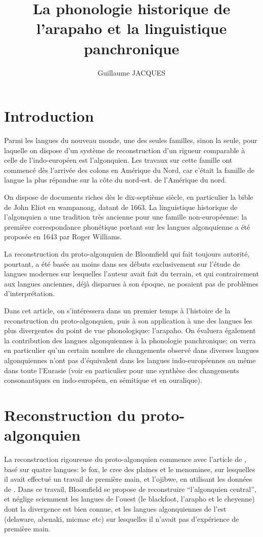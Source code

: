 \documentclass[twoside,a4paper,11pt]{article}
\newcommand{\Σ}{\greek{Σ}}
\begin{document}
\title{La phonologie historique de l'arapaho et la linguistique panchronique }

\author{Guillaume JACQUES }
\maketitle

\section{Introduction}
 	Parmi les langues du nouveau monde, une des seules familles, sinon la seule, pour laquelle on dispose d'un système de reconstruction d'un rigueur comparable à celle de l'indo-européen est l'algonquien. Les travaux sur cette famille ont commencé dès l'arrivée des colons en Amérique du Nord, car c'était la famille de langue la plus répandue sur la côte du nord-est. de l'Amérique du nord.
 	
	On dispose de documents riches dès le dix-septième siècle, en particulier la bible de John Eliot en wampanoag, datant de 1663. La linguistique historique de l'algonquien a une tradition très ancienne pour une famille non-européenne: la première correspondance phonétique portant sur les langues algonquienne a été proposée en 1643 par Roger Williams.
	
	
	La reconstruction du proto-algonquien de Bloomfield qui fait toujours autorité, pourtant, a été basée au moins dans ses débuts exclusivement sur l'étude de langues modernes sur lesquelles l'auteur avait fait du terrain, et qui contrairement aux langues anciennes, déjà disparues à son époque, ne posaient pas de problèmes d'interprétation.
	
	Dans cet article, on s'intéressera dans un premier temps à l'histoire de la reconstruction du proto-algonquien, puis à son application à une des langues les plus divergentes du point de vue phonologique: l'arapaho. On évaluera également la contribution des langues algonquiennes à la phonologie panchronique; on verra en particulier qu'un certain nombre de changements observé dans diverses langues algonquiennes n'ont pas d'équivalent dans les langues indo-européennes au même dans toute l'Eurasie (voir en particulier \citealt{kuemmel07wandel} pour une synthèse des changements consonantiques en indo-européen,  en sémitique et en ouralique).
	
\section{Reconstruction du proto-algonquien}	
La reconstruction rigoureuse du proto-algonquien commence avec l'article de \citet{bloomfield25central}, basé sur quatre langues: le fox, le cree des plaines et le menominee, sur lesquelles il avait effectué un travail de première main, et l'ojibwe, en utilisant les données de \citet{jones17ojibwe}. Dans ce travail, Bloomfield se propose de reconstruire ``l'algonquien central'', et néglige sciemment les langues de l'ouest (le blackfoot, l'arapho et le cheyenne) dont la divergence est bien connue, et les langues algonquiennes de l'est (delaware, abenaki, micmac etc) sur lesquelles il n'avait pas d'expérience de première main.
\end{document}
